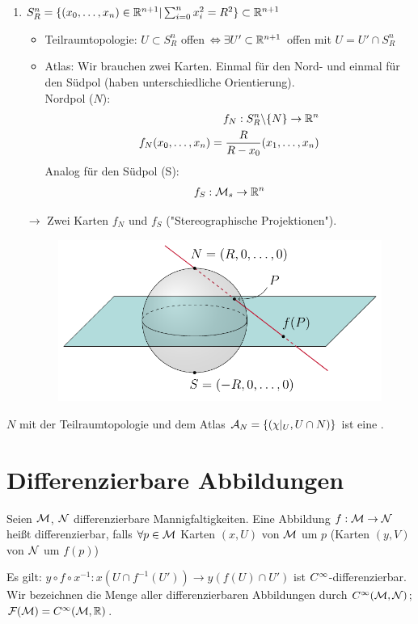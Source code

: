 \begin{bsp}
\begin{enumerate}
\item $S_R^n = \{ (x_0, \dots, x_n) \in \mathbb{R}^{n+1} \vert \sum_{i=0}^n x_i^2 = R^2 \} \subset \mathbb{R}^{n+1}$

\begin{itemize}
\item Teilraumtopologie: $U \subset S^n_R$ offen $\Leftrightarrow \exists U' \subset \mathbb{R}^{n+1}$ offen mit $U = U' \cap S^n_R$
\item Atlas: Wir brauchen zwei Karten. 
Einmal für den Nord- und einmal für den Südpol (haben unterschiedliche Orientierung).  \\
Nordpol ($N$):
\begin{align}
f_N : S^n_R \backslash \{ N \} \to \mathbb{R}^n \\
f_N (x_0, \dots , x_n) = \frac{R}{R- x_0} (x_1, \dots, x_n) 
\end{align}
Analog für den Südpol (S):
\begin{align}
f_S : \mathcal{M}_s \to \mathbb{R}^n
\end{align}
\end{itemize}
$\to$ Zwei Karten $f_N$ und $f_S$ ("Stereographische Projektionen").
\begin{figure}[H]
\centering
\includegraphics[scale=0.8]{figures/tikz/stereographic_projection.pdf}
\end{figure}
\end{enumerate}
\end{bsp}

\begin{bem}
$N$ mit der Teilraumtopologie und dem Atlas $\mathcal{A}_N = \left\{(\chi\vert_U, U\cap N)\right\}$ ist eine \difM.
\end{bem}

\section{Differenzierbare Abbildungen}
\begin{defs}
Seien $\mathcal{M}$, $\mathcal{N}$ differenzierbare Mannigfaltigkeiten. 
Eine Abbildung $f: \mathcal{M} \to \mathcal{N}$ heißt differenzierbar, falls $\forall p \in \mathcal{M}$ Karten $(x, U)$ von $\mathcal{M}$ um $p$ (Karten $(y, V)$ von $\mathcal{N}$ um $f(p)$)
\end{defs}
Es gilt: $y \circ f \circ x^{-1}: x(U \cap f^{-1} (U')) \to y(f(U) \cap U')$ ist $C^\infty$-differenzierbar.
Wir bezeichnen die Menge aller differenzierbaren Abbildungen durch $C^\infty(\mathcal{M}, \mathcal{N})$; $\mathcal{F}(\mathcal{M}) = C^\infty(\mathcal{M}, \mathbb{R})$.

